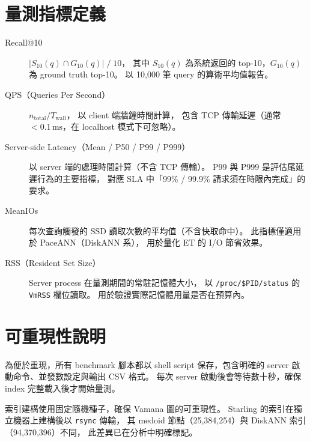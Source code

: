 \section{量測指標定義}
\label{sec:metrics}

\begin{description}
  \item[Recall@10]
    $|S_{10}(q) \cap G_{10}(q)| \;/\; 10$，
    其中 $S_{10}(q)$ 為系統返回的 top-10，$G_{10}(q)$ 為 ground truth top-10。
    以 10,000 筆 query 的算術平均值報告。

  \item[QPS（Queries Per Second）]
    $n_\text{total} / T_\text{wall}$，
    以 client 端牆鐘時間計算，
    包含 TCP 傳輸延遲（通常 $< 0.1\,\text{ms}$，在 localhost 模式下可忽略）。

  \item[Server-side Latency（Mean / P50 / P99 / P999）]
    以 server 端的處理時間計算（不含 TCP 傳輸）。
    P99 與 P999 是評估尾延遲行為的主要指標，
    對應 SLA 中「99\% / 99.9\% 請求須在時限內完成」的要求。

  \item[MeanIOs]
    每次查詢觸發的 SSD 讀取次數的平均值（不含快取命中）。
    此指標僅適用於 PaceANN（DiskANN 系），
    用於量化 ET 的 I/O 節省效果。

  \item[RSS（Resident Set Size）]
    Server process 在量測期間的常駐記憶體大小，
    以 \texttt{/proc/\$PID/status} 的 \texttt{VmRSS} 欄位讀取。
    用於驗證實際記憶體用量是否在預算內。
\end{description}

\section{可重現性說明}
\label{sec:reproducibility}

為便於重現，所有 benchmark 腳本都以 shell script 保存，包含明確的 server 啟動命令、並發數設定與輸出 CSV 格式。
每次 server 啟動後會等待數十秒，確保 index 完整載入後才開始量測。

索引建構使用固定隨機種子，確保 Vamana 圖的可重現性。
Starling 的索引在獨立機器上建構後以 \texttt{rsync} 傳輸，
其 medoid 節點（25,384,254）與 DiskANN 索引（94,370,396）不同，
此差異已在分析中明確標記。
